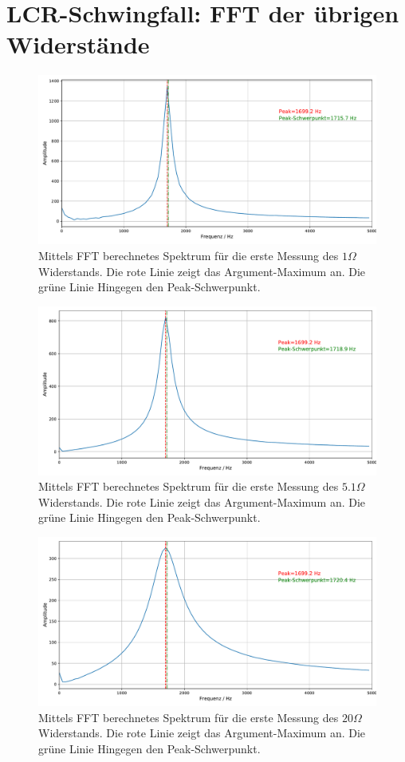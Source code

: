 \documentclass[a4paper, 12pt]{scrartcl}
\begin{document}
\section{LCR-Schwingfall: FFT der übrigen Widerstände}\label{app:fft}
\begin{figure}[H]
\centering
\includegraphics[width=\textwidth]{plots/fft/fft_schwingung1_1.pdf}
\caption{Mittels FFT berechnetes Spektrum für die erste Messung des $1\Omega$ Widerstands. Die rote Linie zeigt das Argument-Maximum an. Die grüne Linie Hingegen den Peak-Schwerpunkt.}
\end{figure}
\begin{figure}[H]
\centering
\includegraphics[width=\textwidth]{plots/fft/fft_schwingung2_1.pdf}
\caption{Mittels FFT berechnetes Spektrum für die erste Messung des $5.1\Omega$ Widerstands. Die rote Linie zeigt das Argument-Maximum an. Die grüne Linie Hingegen den Peak-Schwerpunkt.}
\end{figure}
\begin{figure}[H]
\centering
\includegraphics[width=\textwidth]{plots/fft/fft_schwingung4_1.pdf}
\caption{Mittels FFT berechnetes Spektrum für die erste Messung des $20\Omega$ Widerstands. Die rote Linie zeigt das Argument-Maximum an. Die grüne Linie Hingegen den Peak-Schwerpunkt.}
\end{figure}
\end{document}
